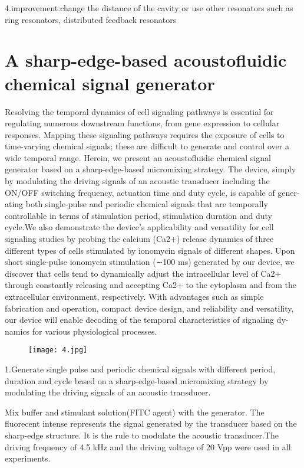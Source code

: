 \documentclass{article}
\begin{document}
4.improvement:change the distance of the cavity or use other resonators such as ring resonators, distributed feedback resonators


\part{A sharp-edge-based acoustofluidic chemical signal generator}

Resolving the temporal dynamics of cell signaling pathways is essential for regulating numerous downstream functions, from gene expression to cellular responses. Mapping these signaling pathways requires the exposure of cells to time-varying chemical signals; these are difficult to generate and control over a wide temporal range. Herein, we present an acoustofluidic chemical signal generator based on a sharp-edge-based micromixing strategy. The device, simply by modulating the driving signals of an acoustic transducer including the ON/OFF switching frequency, actuation time and duty cycle, is capable of gener- ating both single-pulse and periodic chemical signals that are temporally controllable in terms of stimulation period, stimulation duration and duty cycle.We also demonstrate the device's applicability and versatility for cell signaling studies by probing the calcium (Ca2+) release dynamics of three different types of cells stimulated by ionomycin signals of different shapes. Upon short single-pulse ionomycin stimulation (∼100 ms) generated by our device, we discover that cells tend to dynamically adjust the intracellular level of Ca2+ through constantly releasing and accepting Ca2+ to the cytoplasm and from the extracellular environment, respectively. With advantages such as simple fabrication and operation, compact device design, and reliability and versatility, our device will enable decoding of the temporal characteristics of signaling dy- namics for various physiological processes.

\begin{figure}[H]
\centering
\texttt{[image: 4.jpg]}
\end{figure}

1.Generate single pulse and periodic chemical signals with different period, duration and cycle  based on a sharp-edge-based micromixing strategy by modulating the driving signals of an acoustic transducer.


Mix buffer and stimulant solution(FITC agent) with the generator. The fluorecent intense represents the signal generated by the transducer based on the sharp-edge structure. It is the rule to modulate the acoustic transducer.The driving frequency of 4.5 kHz and the driving voltage of 20 Vpp were used in all experiments.
\end{document}
